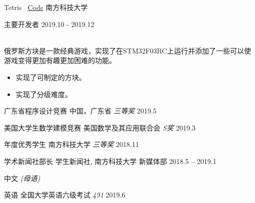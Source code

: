 \documentclass[10pt,a4paper]{article}
\begin{document}
\headedsection
  {Tetris \faGithub~\href{https://github.com/Eveneko/Tetris}{Code}}
  {\textsc{南方科技大学}} {%
  \headedsubsection
    {主要开发者}
    {2019.10 - 2019.12}
    {
      \\
      俄罗斯方块是一款经典游戏，实现了在STM32F03RC上运行并添加了一些可以使游戏变得更加有趣更加困难的功能。
      \begin{itemize}
        \item 实现了可制定的方块。
        \item 实现了分级难度。
      \end{itemize}
    }
}


\spacedhrule{0.5em}{-0.4em}


\headedsection
  {广东省程序设计竞赛}
  {\textsc{中国，广东省}} {%
  \headedsubsection
    {\textit {三等奖}}
    {2019.5}
    {}
}

\headedsection
  {美国大学生数学建模竞赛}
  {\textsc{美国数学及其应用联合会}} {%
  \headedsubsection
    {\textit {S奖}}
    {2019.3}
    {}
}

\headedsection
  {年度优秀学生}
  {\textsc{南方科技大学}} {%
  \headedsubsection
    {\textit {三等奖}}
    {2018.11}
    {}
}


\spacedhrule{0.5em}{-0.4em}


\headedsection
  {学术新闻社部长}
  {\textsc{学生新闻社, 南方科技大学}} {%
  \headedsubsection
    {新媒体部}
    {2018.5 -- 2019.1}
    {}
}

\spacedhrule{0.5em}{-0.4em}


\inlineheadsection %
  {中文}
  {\emph{(母语)}}

  \headedsection
  {英语}
  {} {%
  \headedsubsection
    {全国大学英语六级考试 \emph{491}}
    {2019.6}
    {}
}
\end{document}
